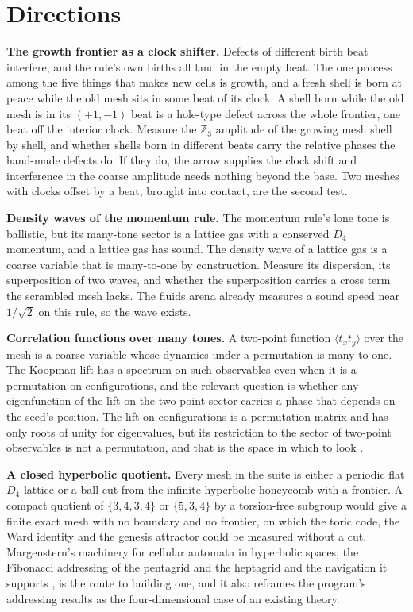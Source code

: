 \section{Directions}

\textbf{The growth frontier as a clock shifter.} Defects of different birth beat interfere, and the rule's own
births all land in the empty beat. The one process among the five things that makes new cells is growth, and a
fresh shell is born at peace while the old mesh sits in some beat of its clock. A shell born while the old mesh is
in its $(+1,-1)$ beat is a hole-type defect across the whole frontier, one beat off the interior clock. Measure the
$\mathbb{Z}_3$ amplitude of the growing mesh shell by shell, and whether shells born in different beats carry the
relative phases the hand-made defects do. If they do, the arrow supplies the clock shift and interference in the
coarse amplitude needs nothing beyond the base. Two meshes with clocks offset by a beat, brought into contact, are
the second test.

\textbf{Density waves of the momentum rule.} The momentum rule's lone tone is ballistic, but its many-tone sector is
a lattice gas with a conserved $D_4$ momentum, and a lattice gas has sound. The density wave of a lattice gas is a
coarse variable that is many-to-one by construction. Measure its dispersion, its superposition of two waves, and
whether the superposition carries a cross term the scrambled mesh lacks. The fluids arena already measures a sound
speed near $1/\sqrt2$ on this rule, so the wave exists.

\textbf{Correlation functions over many tones.} A two-point function $\langle t_x t_y\rangle$ over the mesh is a
coarse variable whose dynamics under a permutation is many-to-one. The Koopman lift has a spectrum on such
observables even when it is a permutation on configurations, and the relevant question is whether any eigenfunction
of the lift on the two-point sector carries a phase that depends on the seed's position. The lift on configurations
is a permutation matrix and has only roots of unity for eigenvalues, but its restriction to the sector of two-point
observables is not a permutation, and that is the space in which to look \cite{koopman1931, thooft2016}.

\textbf{A closed hyperbolic quotient.} Every mesh in the suite is either a periodic flat $D_4$ lattice or a ball cut
from the infinite hyperbolic honeycomb with a frontier. A compact quotient of $\{3,4,3,4\}$ or $\{5,3,4\}$ by a
torsion-free subgroup would give a finite exact mesh with no boundary and no frontier, on which the toric code, the
Ward identity and the genesis attractor could be measured without a cut. Margenstern's machinery for cellular
automata in hyperbolic spaces, the Fibonacci addressing of the pentagrid and the heptagrid and the navigation it
supports \cite{margenstern2007vol1, margenstern2008vol2}, is the route to building one, and it also reframes the
program's addressing results as the four-dimensional case of an existing theory.


